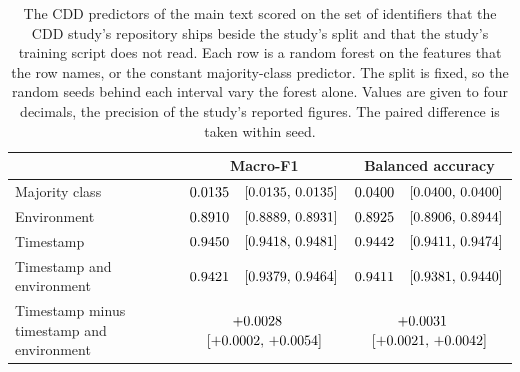 \documentclass[11pt]{article}
\begin{document}
\begin{table}[H]
\centering
\footnotesize
\caption{Accuracy and balanced accuracy of the AI Hub predictors per crop, untuned
forests. Values are means over \numSeeds{} random seeds.}
\label{tab:scores}

\end{table}

\begin{table}[H]
\centering
\footnotesize
\caption{The soil-chemistry classifier's accuracy advantage over the majority-class predictor
on the AI Hub dataset at three session minimums, averaged over the crops and the
\numSeeds{} random seeds, over the scored rows with the sessions pooled and within
single sessions, and the lowest and highest crop's within-session advantage.}
\label{tab:floors}

\end{table}

\begin{table}[H]
\centering
\scriptsize
\caption{Macro-F1 of the CDD forests on the study's split by the number of variables
considered at each node of a tree, a share of the number of variables $p$, and at the share
chosen per forest and seed on the study's validation partition. Values are means over
\cddTheirSeeds{} random seeds of the forest with 95\% confidence intervals, paired
within seed for the difference.}
\label{tab:maxfeatures}

\end{table}

\begin{table}[H]
\centering
\footnotesize
\caption{The CDD predictors of the main text scored on the set of identifiers
that the CDD study's repository ships beside the study's split and that the study's
training script does not read. Each row is a random forest on the features that the row
names, or the constant majority-class predictor. The split is fixed, so the
\cddTheirSeeds{} random seeds behind each interval vary the forest alone. Values
are given to four decimals, the precision of the study's reported figures. The
paired difference is taken within seed.}
\label{tab:other-set}
\begin{tabular}{>{\raggedright\arraybackslash}p{}cc}
\toprule
 & Macro-F1 & Balanced accuracy \\
\midrule
Majority class & $0.0135{}$~~$[0.0135,\,0.0135]{}$ & $0.0400{}$~~$[0.0400,\,0.0400]{}$ \\
Environment & $0.8910{}$~~$[0.8889,\,0.8931]{}$ & $0.8925{}$~~$[0.8906,\,0.8944]{}$ \\
Timestamp & $0.9450{}$~~$[0.9418,\,0.9481]{}$ & $0.9442{}$~~$[0.9411,\,0.9474]{}$ \\
Timestamp and environment & $0.9421{}$~~$[0.9379,\,0.9464]{}$ & $0.9411{}$~~$[0.9381,\,0.9440]{}$ \\
\midrule
Timestamp minus timestamp and environment & $+0.0028{}$~~$[+0.0002,\,+0.0054]{}$ & $+0.0031{}$~~$[+0.0021,\,+0.0042]{}$ \\
\bottomrule
\end{tabular}
\end{table}
\end{document}
